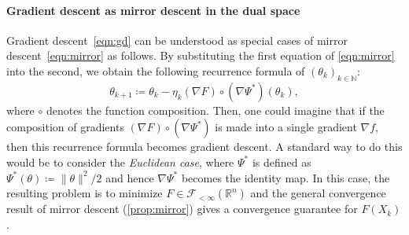 \documentclass[11pt,a4paper]{article}
\theoremstyle{definition}
\theoremstyle{plain}
\newcommand{\RR}{{\mathbb{R}}}
\newcommand{\NN}{{\mathbb{N}}}
\begin{document}
\paragraph{Gradient descent as mirror descent in the dual space}
Gradient descent~\eqref{eqn:gd} can be understood as special cases of mirror descent~\eqref{eqn:mirror} as follows.
By substituting the first equation of \eqref{eqn:mirror} into the second, we obtain the following recurrence formula of $(\theta_k)_{k \in \NN}$:
\[
    \theta_{k + 1} \coloneqq \theta_k - \eta_k (\nabla F)\circ(\nabla \Psi^\ast)(\theta_k),
\]
where $\circ$ denotes the function composition.
Then, one could imagine that if the composition of gradients $(\nabla F)\circ(\nabla \Psi^\ast)$ is made into a single gradient $\nabla f$, then this recurrence formula becomes gradient descent.
A standard way to do this would be to consider the \textit{Euclidean case}, where $\Psi^\ast$ is defined as $\Psi^\ast(\theta) \coloneqq \|\theta\|^2/2$ and hence $\nabla\Psi^\ast$ becomes the identity map.
In this case, the resulting problem is to minimize $F \in \mathcal{F}_{<\infty}(\RR^n)$ and the general convergence result of mirror descent (\cref{prop:mirror}) gives a convergence guarantee for $F(X_k)$.
\end{document}

